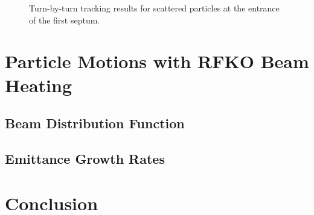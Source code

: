 \documentclass[aps,prstab,onecolumn,preprint,endfloats,11pt]{revtex4-1}
\begin{document}
\begin{figure}[!tbp]
  \caption{\label{fig:beamloss1}Turn-by-turn tracking results for scattered particles at the entrance of the first septum.}
\end{figure}








\clearpage
\section{\label{sec:rfko}Particle Motions with RFKO Beam Heating}

\subsection{\label{sec:dist}Beam Distribution Function}

\subsection{\label{sec:emit}Emittance Growth Rates}

\section{\label{sec:conclusion}Conclusion}
\end{document}
